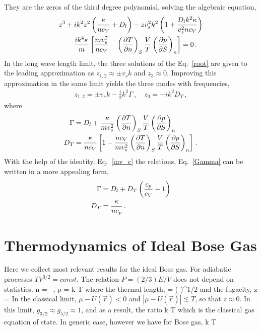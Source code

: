 They are the zeros of the third degree polynomial, solving the algebraic equation,
\begin{align}\label{root}
z^3  &+i k^2 z^2 \left( \frac{\kappa}{n c_V} + D_l \right) - z v_s^2 k^2 \left( 1 + \frac{ D_l k^2 \kappa}{v_s^2 n c_V} \right)
\notag \\
&- \frac{ i k^4 \kappa}{m} \left[ \frac{m v_s^2 }{ n c_V} 
-  \left( \frac{\partial T}{\partial n} \right)_S \frac{V}{T} \left( \frac{\partial p}{\partial S} \right)_n \right]= 0\, .
\end{align}
In the long wave length limit, the three solutions of the Eq.~\eqref{root} are given to the leading approximation as 
$z_{1,2} \approx \pm v_s k$ and $z_3 \approx 0$.
Improving this approximation in the same limit yields the three modes with frequencies,
\begin{align}
z_{1,2} = \pm v_s k - \frac{i}{2} k^2 \Gamma\, ,\quad z_3 = - i k^2 D_T\, ,
\end{align}
where
\begin{align}\label{Gamma}
\Gamma &= D_l + \frac{ \kappa}{ m v_s^2 }  \left( \frac{\partial T}{\partial n} \right)_S \frac{V}{T} \left( \frac{\partial p}{\partial S} \right)_n
\notag \\
D_T & = \frac{ \kappa}{n c_V}\left[1  -  \frac{n c_V}{m v_s^2 }  \left( \frac{\partial T}{\partial n} \right)_S \frac{V}{T} \left( \frac{\partial p}{\partial S} \right)_n \right]\, .
\end{align}
With the help of the identity, Eq.~\eqref{inv_c} the relations, Eq.~\eqref{Gamma} can be written in a more appealing form,
\begin{align}\label{Gamma1}
\Gamma &= D_l + D_T \left( \frac{c_p}{c_V} - 1\right)
\notag \\
D_T & = \frac{\kappa}{n c_p}\, .
\end{align}





\section{Thermodynamics of Ideal Bose Gas}
Here we collect most relevant results for the ideal Bose gas.
For adiabatic processes $TV^{3/2} = const$.
The relation $P = (2/3) E/V$ does not depend on statistics.
\be
n =  \, ,  \quad p = k T  
\ee
where the thermal length,
\be
\Lambda = \left(  \right)^{1/2}
\ee
and the fugacity,
\be
z = \exp[ (\mu - U(\vec{r}) /T]
\ee
In the classical limit, $\mu - U(\vec{r}) < 0$ and $|\mu - U(\vec{r})| \lesssim T$, so that $z \approx 0$.
In this limit, $g_{3/2} \approx g_{5/2} \approx 1$, and as a result, the ratio
\be
{} \approx k T
\ee
which is the classical gas equation of state.
In generic case, however we have for Bose gas,
\be
{} \approx k T 
\ee


